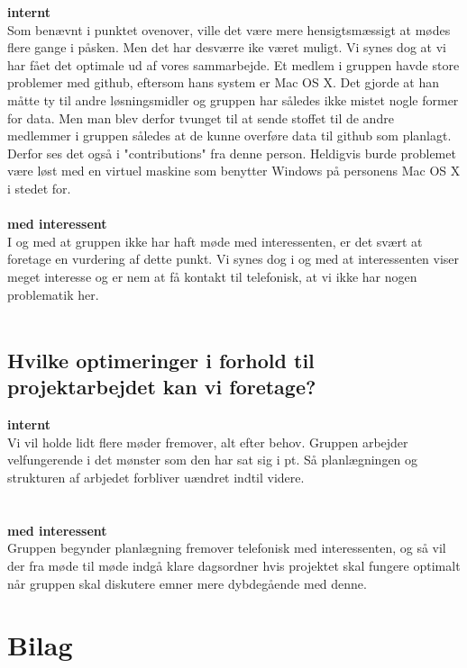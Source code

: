 \documentclass[a4paper,12pt]{article}
\begin{document}
\textbf{internt}
\\
Som benævnt i punktet ovenover, ville det være mere hensigtsmæssigt at mødes flere gange i påsken. Men det har desværre ike været muligt. Vi synes dog at vi har fået det optimale ud af vores sammarbejde.
Et medlem i gruppen havde store problemer med github, eftersom hans system er Mac OS X. Det gjorde at han måtte ty til andre løsningsmidler og gruppen har således ikke mistet nogle former for data. Men man blev derfor tvunget til at sende stoffet til de andre medlemmer i gruppen således at de kunne overføre data til github som planlagt. Derfor ses det også i "contributions" fra denne person. Heldigvis burde problemet være løst med en virtuel maskine som benytter Windows på personens Mac OS X i stedet for.
\\
\\
\textbf{med interessent}
\\
I og med at gruppen ikke har haft møde med interessenten, er det svært at foretage en vurdering af dette punkt. Vi synes dog i og med at interessenten viser meget interesse og er nem at få kontakt til telefonisk, at vi ikke har nogen problematik her. 
\\
\\
\subsection{Hvilke optimeringer i forhold til projektarbejdet kan vi foretage?}

\textbf{internt}
\\
Vi vil holde lidt flere møder fremover, alt efter behov. Gruppen arbejder velfungerende i det mønster som den har sat sig i pt. Så planlægningen og strukturen af arbjedet forbliver uændret indtil videre.
\\ 
\\
\\
\textbf{med interessent}
\\
Gruppen begynder planlægning fremover telefonisk med interessenten, og så vil der fra møde til møde indgå klare dagsordner hvis projektet skal fungere optimalt når gruppen skal diskutere emner mere dybdegående med denne.  

\newpage
{}
\section{Bilag}
\end{document}
